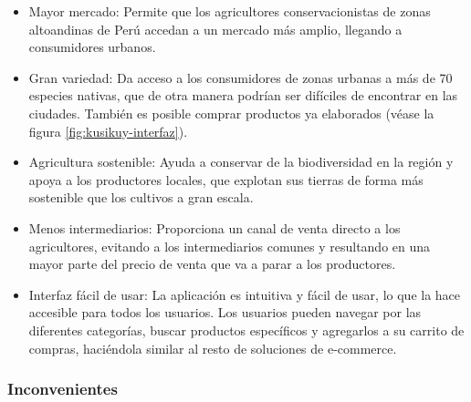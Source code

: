 \begin{itemize}

	\item Mayor mercado: Permite que los agricultores conservacionistas de zonas altoandinas de Perú accedan a un mercado más amplio, llegando a consumidores urbanos.

	\item Gran variedad: Da acceso a los consumidores de zonas urbanas a más de 70 especies nativas, que de otra manera podrían ser difíciles de encontrar en las ciudades. También es posible comprar productos ya elaborados (véase la figura \ref{fig:kusikuy-interfaz}).
	
	\item Agricultura sostenible: Ayuda a conservar de la biodiversidad en la región y apoya a los productores locales, que explotan sus tierras de forma más sostenible que los cultivos a gran escala.

	\item Menos intermediarios: Proporciona un canal de venta directo a los agricultores, evitando a los intermediarios comunes y resultando en una mayor parte del precio de venta que va a parar a los productores.

	\item Interfaz fácil de usar: La aplicación es intuitiva y fácil de usar, lo que la hace accesible para todos los usuarios. Los usuarios pueden navegar por las diferentes categorías, buscar productos específicos y agregarlos a su carrito de compras, haciéndola similar al resto de soluciones de e-commerce.

\end{itemize}

\subsubsection{Inconvenientes}

